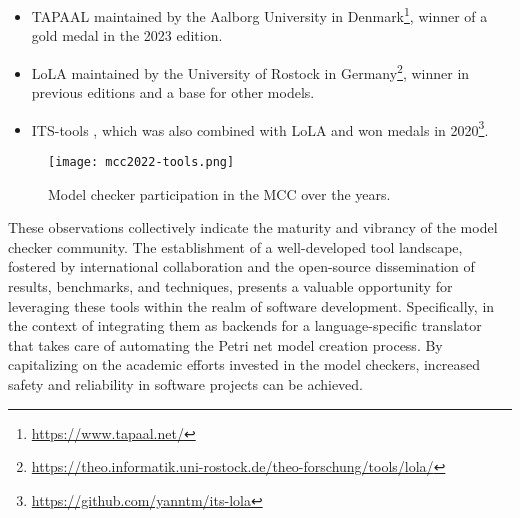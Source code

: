 \begin{itemize}
      \item \acrfull{TAPAAL} maintained by the Aalborg University
            in Denmark\footnote{\url{https://www.tapaal.net/}},
            winner of a gold medal in the 2023 edition.
      \item \acrfull{LoLA} maintained by the University of Rostock
            in Germany\footnote{\url{https://theo.informatik.uni-rostock.de/theo-forschung/tools/lola/}},
            winner in previous editions and a base for other models.
      \item ITS-tools \cite{thierrymieg:hal-02104373},
            which was also combined with \acrshort{LoLA} and won medals
            in 2020\footnote{\url{https://github.com/yanntm/its-lola}}.
\end{itemize}

\begin{figure}[!htb]
      \centering
      \texttt{[image: mcc2022-tools.png]}
      \caption{Model checker participation in the MCC over the years.}
      \label{fig:mcc2022-tools}
\end{figure}

These observations collectively indicate
the maturity and vibrancy of the model checker community.
The establishment of a well-developed tool landscape,
fostered by international collaboration and the open-source dissemination of results, benchmarks, and techniques,
presents a valuable opportunity for leveraging these tools within the realm of software development.
Specifically, in the context of integrating them as backends for a language-specific translator
that takes care of automating the Petri net model creation process.
By capitalizing on the academic efforts invested in the model checkers,
increased safety and reliability in software projects can be achieved.
